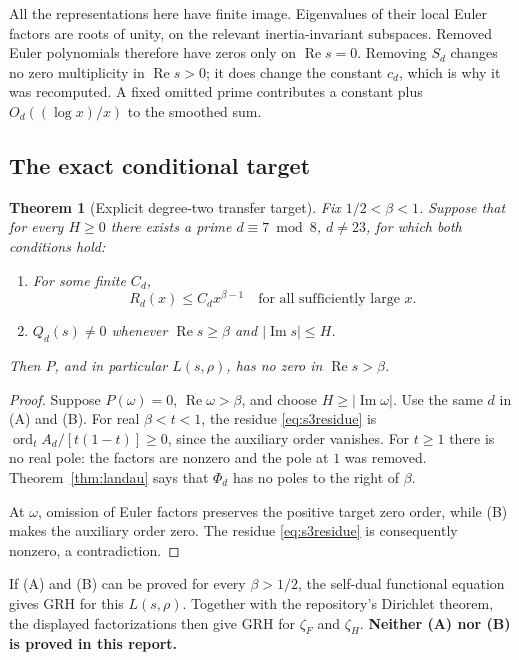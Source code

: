 \documentclass[11pt,letterpaper]{article}
\newtheorem{theorem}{Theorem}[section]
\theoremstyle{definition}
\theoremstyle{remark}
\newcommand{\Rea}{\operatorname{Re}}
\newcommand{\Ima}{\operatorname{Im}}
\newcommand{\ord}{\operatorname{ord}}
\begin{document}
All the representations here have finite image. Eigenvalues of
their local Euler factors are roots of unity, on the relevant
inertia-invariant subspaces. Removed Euler polynomials therefore
have zeros only on \(\Rea s=0\). Removing \(S_d\) changes no zero
multiplicity in \(\Rea s>0\); it does change the constant \(c_d\),
which is why it was recomputed. A fixed omitted prime contributes
a constant plus \(O_d((\log x)/x)\) to the smoothed sum.

\subsection{The exact conditional target}

\begin{theorem}[Explicit degree-two transfer target]\label{thm:s3target}
Fix \(1/2<\beta<1\). Suppose that for every \(H\ge0\) there exists
a prime \(d\equiv7\bmod8\), \(d\ne23\), for which both conditions hold:
\begin{enumerate}[label=(\Alph*)]
\item For some finite \(C_d\),
\[
 R_d(x)\le C_d x^{\beta-1}
 \quad\text{for all sufficiently large }x.
\]
\item \(Q_d(s)\ne0\) whenever
\(\Rea s\ge\beta\) and \(|\Ima s|\le H\).
\end{enumerate}
Then \(P\), and in particular \(L(s,\rho)\), has no zero in
\(\Rea s>\beta\).
\end{theorem}
\begin{proof}
Suppose \(P(\omega)=0\), \(\Rea\omega>\beta\), and choose
\(H\ge|\Ima\omega|\). Use the same \(d\) in (A) and (B).
For real \(\beta<t<1\), the residue \eqref{eq:s3residue}
is \(\ord_tA_d/[t(1-t)]\ge0\), since the auxiliary order
vanishes. For \(t\ge1\) there is no real pole: the factors
are nonzero and the pole at \(1\) was removed.
Theorem~\ref{thm:landau} says that \(\Phi_d\) has no poles to the
right of \(\beta\).

At \(\omega\), omission of Euler factors preserves the positive
target zero order, while (B) makes the auxiliary order zero.
The residue \eqref{eq:s3residue} is consequently nonzero, a
contradiction.
\end{proof}

If (A) and (B) can be proved for every \(\beta>1/2\), the
self-dual functional equation gives GRH for this \(L(s,\rho)\).
Together with the repository's Dirichlet theorem, the displayed
factorizations then give GRH for \(\zeta_F\) and \(\zeta_H\).
\textbf{Neither (A) nor (B) is proved in this report.}
\end{document}
